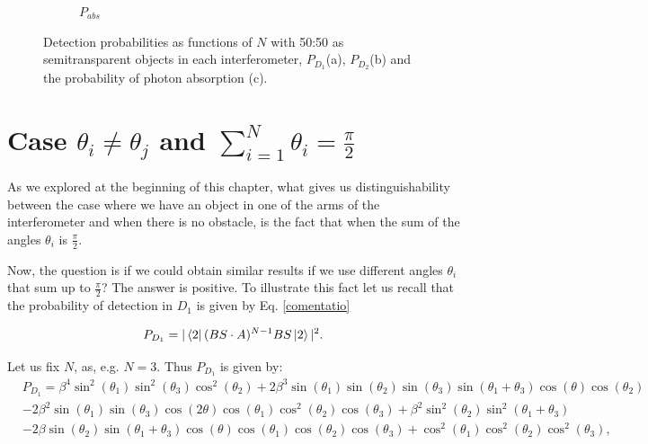 \documentclass[12pt]{book}
\begin{document}
\begin{figure}[!t]
\begin{subfigure}[b]{0.45\linewidth}
\caption{$P_{abs}$}
\label{fig:BS1}
\end{subfigure}
\caption{Detection probabilities as functions of $N$ with 50:50 as semitransparent objects in each interferometer, $P_{D_{1}}$(a), $P_{D_{2}}$(b) and the probability of photon absorption (c).}
\label{Azuma2}
\end{figure}




 


\section{Case $\theta_{i} \neq \theta_{j}$ and $\sum_{i=1}^{N}\theta_{i}=\frac{\pi}{2}$}

As we explored at the beginning of this chapter, what gives us distinguishability between the case where we have an object in one of the arms of the interferometer and when there is no obstacle, is the fact that when the sum of the angles $\theta_{i}$ is $\frac{ \pi}{2}$.


Now, the question is if we could obtain similar results if we use different angles $\theta_{i}$ that sum up to $\frac{\pi}{2}$? The answer is positive. To illustrate this fact let us recall that the probability of detection in $D_{1}$ is given by Eq. \ref{comentatio}

\begin{equation*}
P_{D_{1}}=|\bra{2} (BS \cdot A)^{N-1}BS \ket{2}|^2.
\end{equation*}

Let us fix $N$, as, e.g. $N=3$. Thus $P_{D_{1}}$ is given by:
\small
\begin{align*}
&P_{D_{1}}=\beta^{4} \sin^{2}{\left(\theta_{1} \right)} \sin^{2}{\left(\theta_{3} \right)} \cos^{2}{\left(\theta_{2} \right)} + 2 \beta^{3} \sin{\left(\theta_{1} \right)} \sin{\left(\theta_{2} \right)} \sin{\left(\theta_{3} \right)} \sin{\left(\theta_{1} + \theta_{3} \right)} \cos{\left(\theta \right)} \cos{\left(\theta_{2} \right)} \\
 & - 2 \beta^{2} \sin{\left(\theta_{1} \right)} \sin{\left(\theta_{3} \right)} \cos{\left(2 \theta \right)} \cos{\left(\theta_{1} \right)} \cos^{2}{\left(\theta_{2} \right)} \cos{\left(\theta_{3} \right)} + \beta^{2} \sin^{2}{\left(\theta_{2} \right)} \sin^{2}{\left(\theta_{1} + \theta_{3} \right)} \\
 & - 2 \beta \sin{\left(\theta_{2} \right)} \sin{\left(\theta_{1} + \theta_{3} \right)} \cos{\left(\theta \right)} \cos{\left(\theta_{1} \right)} \cos{\left(\theta_{2} \right)} \cos{\left(\theta_{3} \right)} + \cos^{2}{\left(\theta_{1} \right)} \cos^{2}{\left(\theta_{2} \right)} \cos^{2}{\left(\theta_{3} \right)},
\end{align*}
\normalsize
\end{document}
